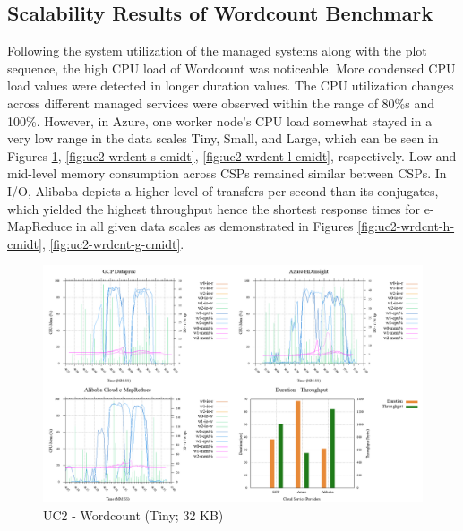 \documentclass[review]{elsarticle}
\begin{document}
\subsection{Scalability Results of Wordcount Benchmark}
Following the system utilization of the managed systems along with the plot sequence, the high CPU load of Wordcount was noticeable. More condensed CPU load values were detected in longer duration values. The CPU utilization changes across different managed services were observed within the range of 80\%s and 100\%. However, in Azure, one worker node's CPU load somewhat stayed in a very low range in the data scales Tiny, Small, and Large, which can be seen in Figures \ref{fig:uc2-wrdcnt-t-cmidt}, \ref{fig:uc2-wrdcnt-s-cmidt}, \ref{fig:uc2-wrdcnt-l-cmidt}, respectively. 
Low and mid-level memory consumption across CSPs remained similar between CSPs. In I/O, Alibaba depicts a higher level of transfers per second than its conjugates, which yielded the highest throughput hence the shortest response times for e-MapReduce in all given data scales as demonstrated in Figures \ref{fig:uc2-wrdcnt-h-cmidt}, \ref{fig:uc2-wrdcnt-g-cmidt}.

\begin{figure}[p]
	\caption{UC2 - Wordcount (Tiny; 32 KB)}
	\label{fig:uc2-wrdcnt-t-cmidt}
	\includegraphics[width=\textwidth]{uc2-wrdcnt-t-cmidt}
	\centering
\end{figure}
\end{document}
